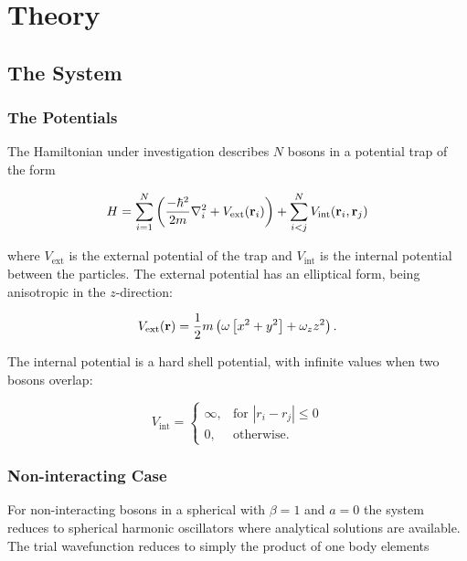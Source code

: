 \section{Theory}\label{sec:Theory}

\subsection{The System}
\subsubsection{The Potentials}

The Hamiltonian under investigation describes \(N\) bosons in a potential trap
of the form

\begin{equation*}
H = \sum_{i=1}^{N}\left( \frac{-\hbar^{2}}{2m}\nabla^{2}_{i} + V_{\text{ext}}(\vb{r}_{i})\right) + \sum_{i<j}^{N}V_{\text{int}}(\vb{r}_{i}, \vb{r}_{j})
\end{equation*}

where \(V_{\text{ext}}\) is the external potential of the trap and 
\(V_{\text{int}}\) is the internal potential between the particles. 
The external potential has an elliptical form, being anisotropic in the \(z\)-direction:

\begin{equation}
\label{eq:2}
V_{\text{ext}}(\vb{r}) = \frac{1}{2}m\left( \omega\left[ x^{2} + y^{2} \right] + \omega_{z}z^{2} \right).
\end{equation}

The internal potential is a hard shell potential, with infinite values when two bosons overlap:

\begin{equation*}
V_{\text{int}} = \begin{cases}
\infty, &\text{for } |r_{i} - r_{j}| \le 0\\
0, &\text{otherwise.}
\end{cases}
\end{equation*}

\subsubsection{Non-interacting Case}
For non-interacting bosons in a spherical with \(\beta = 1\) and \(a = 0\) the
system reduces to spherical harmonic oscillators where analytical solutions are
available. The trial wavefunction reduces to simply the product of one body
elements

